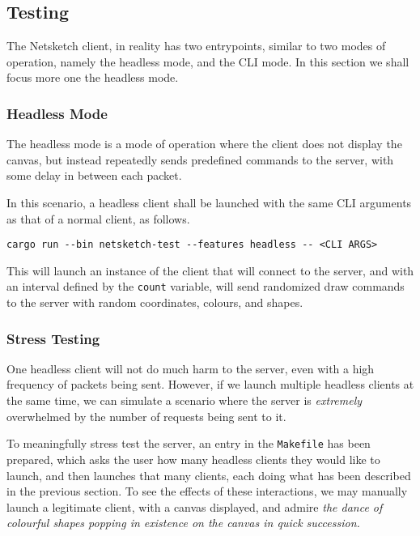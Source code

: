 \documentclass{article}
\newcommand{\code}[1]{\texttt{#1}}
\begin{document}
\subsection{Testing}

The Netsketch client, in reality has two entrypoints, similar to two modes of operation, namely the headless mode, and the CLI mode. In this section we shall focus more one the headless mode.

\subsubsection{Headless Mode}

The headless mode is a mode of operation where the client does not display the
canvas, but instead repeatedly sends predefined commands to the server, with
some delay in between each packet.

In this scenario, a headless client shall be launched with the same CLI arguments as that of a normal client, as follows.

\begin{center}
    \code{cargo run -{-}bin netsketch-test {-}-features headless {-}{-} <CLI ARGS>}
\end{center}

This will launch an instance of the client that will connect to the server, and
with an interval defined by the \code{count} variable, will send randomized draw commands to the server with random coordinates, colours, and shapes.

\subsubsection{Stress Testing}

One headless client will not do much harm to the server, even with a high
frequency of packets being sent. However, if we launch multiple headless clients
at the same time, we can simulate a scenario where the server is \textit{extremely} overwhelmed by the number of requests being sent to it.

To meaningfully stress test the server, an entry in the \code{Makefile} has been
prepared, which asks the user how many headless clients they would like to
launch, and then launches that many clients, each doing what has been described
in the previous section. To see the effects of these interactions, we may
manually launch a legitimate client, with a canvas displayed, and admire \textit{the dance of colourful shapes popping in existence on the
    canvas in quick succession.}
\end{document}
